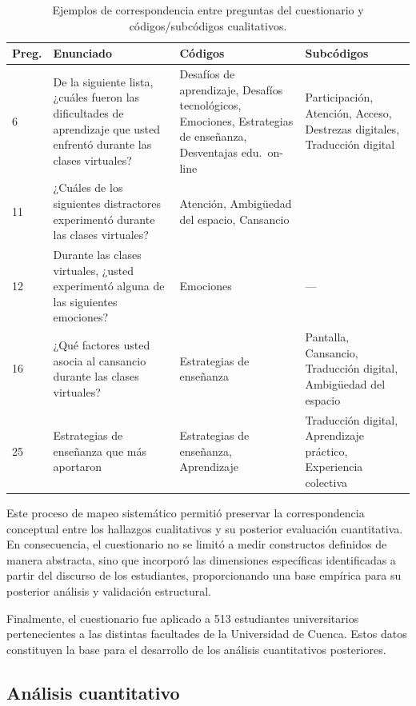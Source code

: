 \documentclass[conference]{IEEEtran}
\begin{document}
\begin{table}[!htb]
\centering
\footnotesize
\begin{tabular}{p{1cm}p{5.5cm}p{3.3cm}p{3.2cm}}
\toprule
\textbf{Preg.} & \textbf{Enunciado} & \textbf{Códigos} & \textbf{Subcódigos} \\
\midrule
6 & De la siguiente lista, ¿cuáles fueron las dificultades de aprendizaje que usted enfrentó durante las clases virtuales? & Desafíos de aprendizaje, Desafíos tecnológicos, Emociones, Estrategias de enseñanza, Desventajas edu.\ on-line & Participación, Atención, Acceso, Destrezas digitales, Traducción digital \\
11 & ¿Cuáles de los siguientes distractores experimentó durante las clases virtuales? & Atención, Ambigüedad del espacio, Cansancio \\
12 & Durante las clases virtuales, ¿usted experimentó alguna de las siguientes emociones? & Emociones & --- \\
16 & ¿Qué factores usted asocia al cansancio durante las clases virtuales?
 & Estrategias de enseñanza & Pantalla, Cansancio, Traducción digital, Ambigüedad del espacio \\
25 & Estrategias de enseñanza que más aportaron & Estrategias de enseñanza, Aprendizaje & Traducción digital, Aprendizaje práctico, Experiencia colectiva \\
\bottomrule
\end{tabular}
\caption{Ejemplos de correspondencia entre preguntas del cuestionario y códigos/subcódigos cualitativos.}
\label{tab:mapeo_preguntas}
\end{table}

Este proceso de mapeo sistemático permitió preservar la correspondencia conceptual entre los hallazgos cualitativos y su posterior evaluación cuantitativa. En consecuencia, el cuestionario no se limitó a medir constructos definidos de manera abstracta, sino que incorporó las dimensiones específicas identificadas a partir del discurso de los estudiantes, proporcionando una base empírica para su posterior análisis y validación estructural.

Finalmente, el cuestionario fue aplicado a 513 estudiantes universitarios pertenecientes a las distintas facultades de la Universidad de Cuenca. Estos datos constituyen la base para el desarrollo de los análisis cuantitativos posteriores.

\subsection{Análisis cuantitativo}
\end{document}
